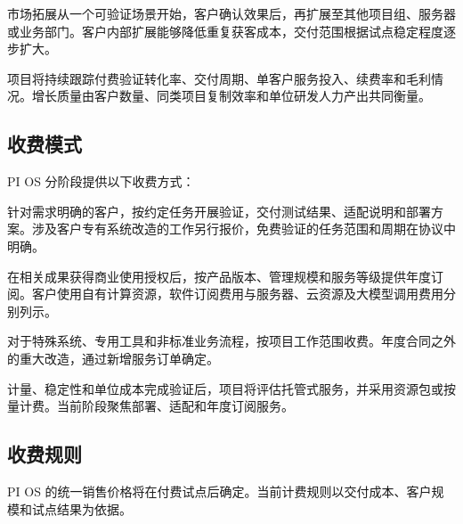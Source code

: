 市场拓展从一个可验证场景开始，客户确认效果后，再扩展至其他项目组、服务器或业务部门。客户内部扩展能够降低重复获客成本，交付范围根据试点稳定程度逐步扩大。

项目将持续跟踪付费验证转化率、交付周期、单客户服务投入、续费率和毛利情况。增长质量由客户数量、同类项目复制效率和单位研发人力产出共同衡量。

\subsection{收费模式}\label{sec:4.4.5}
PI OS 分阶段提供以下收费方式：

针对需求明确的客户，按约定任务开展验证，交付测试结果、适配说明和部署方案。涉及客户专有系统改造的工作另行报价，免费验证的任务范围和周期在协议中明确。

在相关成果获得商业使用授权后，按产品版本、管理规模和服务等级提供年度订阅。客户使用自有计算资源，软件订阅费用与服务器、云资源及大模型调用费用分别列示。

对于特殊系统、专用工具和非标准业务流程，按项目工作范围收费。年度合同之外的重大改造，通过新增服务订单确定。

计量、稳定性和单位成本完成验证后，项目将评估托管式服务，并采用资源包或按量计费。当前阶段聚焦部署、适配和年度订阅服务。

\subsection{收费规则}\label{sec:4.4.6}
PI OS 的统一销售价格将在付费试点后确定。当前计费规则以交付成本、客户规模和试点结果为依据。

